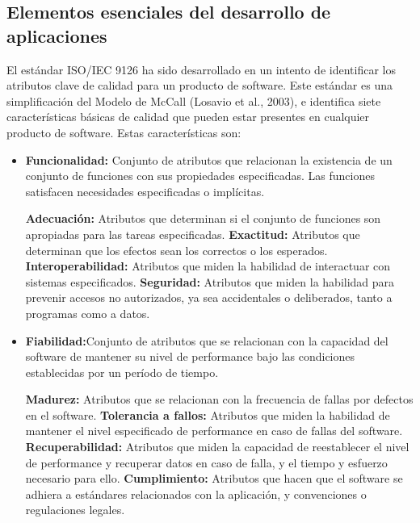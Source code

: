 \begin{center}

	\section{Elementos esenciales del desarrollo de aplicaciones}

	El estándar ISO/IEC 9126 ha sido desarrollado en
	un intento de identificar los atributos clave de
	calidad para un producto de software. Este
	estándar es una simplificación del Modelo de
	McCall (Losavio et al., 2003), e identifica siete
	características básicas de calidad que pueden
	estar presentes en cualquier producto de software.
	Estas características son:
	\begin{itemize}
		\item \textbf{Funcionalidad:} Conjunto de atributos que relacionan la
		      existencia de un conjunto de funciones con sus
		      propiedades especificadas. Las funciones satisfacen
		      necesidades especificadas o implícitas.

		      \subitem \textbf{Adecuación:} Atributos que determinan si el conjunto de
		      funciones son apropiadas para las tareas especificadas.
		      \subitem \textbf{Exactitud:} Atributos que determinan que los efectos
		      sean los correctos o los esperados.
		      \subitem \textbf{Interoperabilidad:} Atributos que miden la habilidad de
		      interactuar con sistemas especificados.
		      \subitem \textbf{Seguridad:} Atributos que miden la habilidad para
		      prevenir accesos no autorizados, ya sea accidentales o
		      deliberados, tanto a programas como a datos.

		\item \textbf{Fiabilidad:}Conjunto de atributos que se relacionan con
		      la capacidad del software de mantener su nivel de
		      performance bajo las condiciones establecidas por un
		      período de tiempo.

		      \subitem \textbf{Madurez:} Atributos que se relacionan con la frecuencia
		      de fallas por defectos en el software.
		      \subitem \textbf{Tolerancia a fallos:} Atributos que miden la habilidad
		      de mantener el nivel especificado de performance en
		      caso de fallas del software.
		      \subitem \textbf{Recuperabilidad:} Atributos que miden la capacidad de
		      reestablecer el nivel de performance y recuperar datos
		      en caso de falla, y el tiempo y esfuerzo necesario para
		      ello.
		      \subitem \textbf{Cumplimiento:} Atributos que hacen que el software se
		      adhiera a estándares relacionados con la aplicación, y
		      convenciones o regulaciones legales.


\end{itemize}
\end{center}
